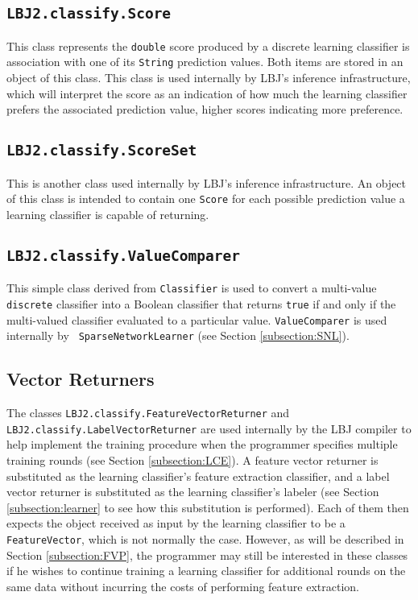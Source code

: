 \subsection{{\tt LBJ2.classify.Score}}
This class represents the {\tt double} score produced by a discrete learning
classifier is association with one of its {\tt String} prediction values.
Both items are stored in an object of this class.  This class is used
internally by LBJ's inference infrastructure, which will interpret the score
as an indication of how much the learning classifier prefers the associated
prediction value, higher scores indicating more preference.

\subsection{{\tt LBJ2.classify.ScoreSet}} \label{subsection:scoreSet}
This is another class used internally by LBJ's inference infrastructure.  An
object of this class is intended to contain one {\tt Score} for each possible
prediction value a learning classifier is capable of returning.

\subsection{{\tt LBJ2.classify.ValueComparer}}
This simple class derived from {\tt Classifier} is used to convert a
multi-value {\tt discrete} classifier into a Boolean classifier that returns
{\tt true} if and only if the multi-valued classifier evaluated to a
particular value.  {\tt ValueComparer} is used internally by {\tt
SparseNetworkLearner} (see Section \ref{subsection:SNL}).

\subsection{Vector Returners} \label{subsection:vectorReturners}
The classes {\tt LBJ2.classify.FeatureVectorReturner} and \\
{\tt LBJ2.classify.LabelVectorReturner} are used internally by the LBJ
compiler to help implement the training procedure when the programmer
specifies multiple training rounds (see Section \ref{subsection:LCE}).  A
feature vector returner is substituted as the learning classifier's feature
extraction classifier, and a label vector returner is substituted as the
learning classifier's labeler (see Section \ref{subsection:learner} to see how
this substitution is performed).  Each of them then expects the object
received as input by the learning classifier to be a {\tt FeatureVector},
which is not normally the case.  However, as will be described in Section
\ref{subsection:FVP}, the programmer may still be interested in these classes
if he wishes to continue training a learning classifier for additional rounds
on the same data without incurring the costs of performing feature extraction.

